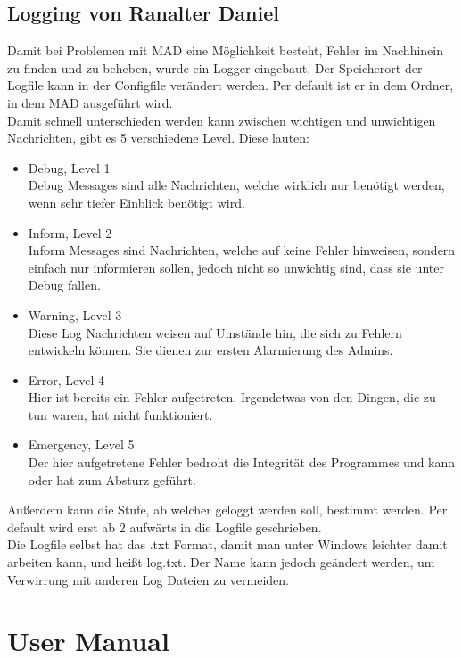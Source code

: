 \documentclass[12pt,a4paper]{report}
\begin{document}
\begin{onehalfspace}

\chapter{Logging von Ranalter Daniel}
Damit bei Problemen mit MAD eine Möglichkeit besteht, Fehler im Nachhinein zu finden und zu beheben, wurde ein Logger eingebaut. Der Speicherort der Logfile kann in der Configfile verändert werden. Per default ist er in dem Ordner, in dem MAD ausgeführt wird.\\
Damit schnell unterschieden werden kann zwischen wichtigen und unwichtigen Nachrichten, gibt es 5 verschiedene \glqq Level\grqq . Diese lauten:
\begin{itemize}
\item Debug, Level 1\\
Debug Messages sind alle Nachrichten, welche wirklich nur benötigt werden, wenn sehr tiefer Einblick benötigt wird. 
\item Inform, Level 2\\
Inform Messages sind Nachrichten, welche auf keine Fehler hinweisen, sondern einfach nur informieren sollen, jedoch nicht so unwichtig sind, dass sie unter Debug fallen.
\item Warning, Level 3\\
Diese Log Nachrichten weisen auf Umstände hin, die sich zu Fehlern entwickeln können. Sie dienen zur ersten Alarmierung des Admins.
\item Error, Level 4\\
Hier ist bereits ein Fehler aufgetreten. Irgendetwas von den Dingen, die zu tun waren, hat nicht funktioniert. 
\item Emergency, Level 5\\
Der hier aufgetretene Fehler bedroht die Integrität des Programmes und kann oder hat zum Absturz geführt. 
\end{itemize}
Außerdem kann die Stufe, ab welcher geloggt werden soll, bestimmt werden. Per default wird erst ab 2 aufwärts in die Logfile geschrieben.\\

Die Logfile selbst hat das .txt Format, damit man unter Windows leichter damit arbeiten kann, und heißt log.txt. Der Name kann jedoch geändert werden, um Verwirrung mit anderen Log Dateien zu vermeiden. 

\part{User Manual}


\end{onehalfspace}
\end{document}
